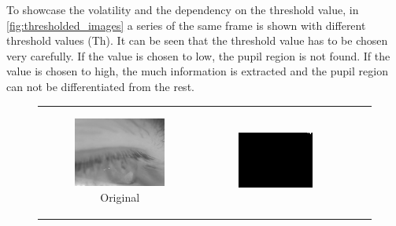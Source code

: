To showcase the volatility and the dependency on the threshold value, in \ref{fig:thresholded_images} a series of the same frame is shown with different threshold values (Th). It can be seen that the threshold value has to be chosen very carefully. If the value is chosen to low, the pupil region is not found. If the value is chosen to high, the much information is extracted and the pupil region can not be differentiated from the rest. 


\begin{figure}[htbp]
    \centering
    \begin{tabular}{cccc}
    \begin{subfigure}{0.2\linewidth}
    \centering
    \includegraphics[width=\linewidth]{plots/thresholding/thresholded_eyelid.jpg}
    \caption{Original}
    \end{subfigure} &
    \begin{subfigure}{0.2\linewidth}
    \centering
    \includegraphics[width=\linewidth]{plots/thresholding/th1}

\end{subfigure}
\end{tabular}
\end{figure}
